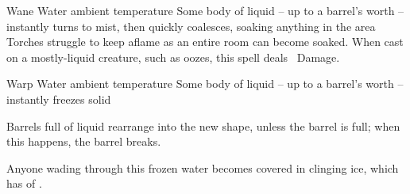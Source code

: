 \ifodd\value{diceNo}

  {}%
  {Wane}%
  {Water}%
  {ambient temperature}%
  {Some body of liquid -- up to a barrel's worth -- instantly turns to mist, then quickly coalesces, soaking anything in the area}%
  {Torches struggle to keep aflame as an entire room can become soaked.
    When cast on a mostly-liquid creature, such as oozes, this spell deals \showDam~Damage.}

\else

  {}%
  {Warp}%
  {Water}%
  {ambient temperature}%
  {Some body of liquid -- up to a barrel's worth -- instantly freezes solid}%
  {Barrels full of liquid rearrange into the new shape, unless the barrel is full; when this happens, the barrel breaks.

  Anyone wading through this frozen water becomes covered in clinging ice, which has  of .}

\fi
{}
